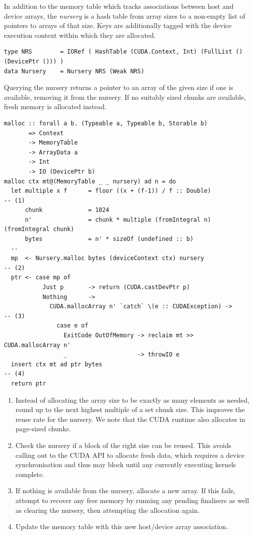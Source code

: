 In addition to the memory table which tracks associations between host and
device arrays, the \emph{nursery} is a hash table from array sizes to a
non-empty list of pointers to arrays of that size. Keys are additionally tagged
with the device execution context within which they are allocated.
%
\begin{lstlisting}[style=haskell]
type NRS        = IORef ( HashTable (CUDA.Context, Int) (FullList () (DevicePtr ())) )
data Nursery    = Nursery NRS (Weak NRS)
\end{lstlisting}
%
Querying the nursery returns a pointer to an array of the given size if one is
available, removing it from the nursery. If no suitably sized chunks are
available, fresh memory is allocated instead.
%
\begin{lstlisting}[style=haskell]
malloc :: forall a b. (Typeable a, Typeable b, Storable b)
       => Context
       -> MemoryTable
       -> ArrayData a
       -> Int
       -> IO (DevicePtr b)
malloc ctx mt@(MemoryTable _ _ nursery) ad n = do
  let multiple x f      = floor ((x + (f-1)) / f :: Double)             -- (1)
      chunk             = 1024
      n'                = chunk * multiple (fromIntegral n) (fromIntegral chunk)
      bytes             = n' * sizeOf (undefined :: b)
  --
  mp  <- Nursery.malloc bytes (deviceContext ctx) nursery               -- (2)
  ptr <- case mp of
           Just p       -> return (CUDA.castDevPtr p)
           Nothing      ->
             CUDA.mallocArray n' `catch` \(e :: CUDAException) ->       -- (3)
               case e of
                 ExitCode OutOfMemory -> reclaim mt >> CUDA.mallocArray n'
                 _                    -> throwIO e
  insert ctx mt ad ptr bytes                                            -- (4)
  return ptr
\end{lstlisting}
%
\begin{enumerate}
\item Instead of allocating the array size to be exactly as many elements as
    needed, round up to the next highest multiple of a set chunk size. This
    improves the reuse rate for the nursery. We note that the CUDA runtime also
    allocates in page-sized chunks.

\item Check the nursery if a block of the right size can be reused. This avoids
    calling out to the CUDA API to allocate fresh data, which requires a
    device synchronisation and thus may block until any currently executing
    kernels complete.

\item If nothing is available from the nursery, allocate a new array. If this
    fails, attempt to recover any free memory by running any pending finalisers
    as well as clearing the nursery, then attempting the allocation again.

\item Update the memory table with this new host/device array association.

\end{enumerate}

